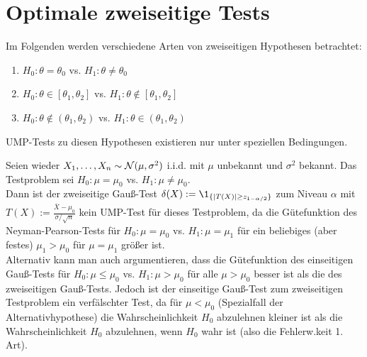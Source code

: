 \section{%
    Optimale zweiseitige Tests%
}

\begin{Bem}
    Im Folgenden werden verschiedene Arten von zweiseitigen Hypothesen betrachtet:
    \begin{enumerate}[label=\arabic*.]
        \item
        $H_0\colon \theta = \theta_0$ vs.
        $H_1\colon \theta \not= \theta_0$

        \item
        $H_0\colon \theta \in [\theta_1, \theta_2]$ vs.
        $H_1\colon \theta \notin [\theta_1, \theta_2]$

        \item
        $H_0\colon \theta \notin (\theta_1, \theta_2)$ vs.
        $H_1\colon \theta \in (\theta_1, \theta_2)$
    \end{enumerate}
    UMP-Tests zu diesen Hypothesen existieren nur unter speziellen Bedingungen.
\end{Bem}

\begin{Bsp}
    Seien wieder $X_1, \dotsc, X_n \sim \mathcal{N}(\mu, \sigma^2)$ i.i.d. mit $\mu$ unbekannt und
    $\sigma^2$ bekannt.
    Das Testproblem sei $H_0\colon \mu = \mu_0$ vs. $H_1\colon \mu \not= \mu_0$.\\
    Dann ist der zweiseitige Gauß-Test $\delta(X) := \1_{\{|T(X)| \ge z_{1-\alpha/2}\}}$
    zum Niveau $\alpha$ mit $T(X) := \frac{\overline{X} - \mu_0}{\sigma/\sqrt{n}}$
    kein UMP-Test für dieses Testproblem,
    da die Gütefunktion des Neyman-Pearson-Tests für
    $H_0\colon \mu = \mu_0$ vs. $H_1\colon \mu = \mu_1$ für ein beliebiges (aber festes)
    $\mu_1 > \mu_0$ für $\mu = \mu_1$ größer ist.\\
    Alternativ kann man auch argumentieren, dass die Gütefunktion des einseitigen Gauß-Tests für
    $H_0\colon \mu \le \mu_0$ vs. $H_1\colon \mu > \mu_0$ für alle $\mu > \mu_0$ besser ist
    als die des zweiseitigen Gauß-Tests.
    Jedoch ist der einseitige Gauß-Test zum zweiseitigen Testproblem ein verfälschter Test,
    da für $\mu < \mu_0$ (Spezialfall der Alternativhypothese) die Wahrscheinlichkeit
    $H_0$ abzulehnen kleiner ist als die Wahrscheinlichkeit $H_0$ abzulehnen, wenn $H_0$
    wahr ist (also die Fehlerw.keit 1. Art).
\end{Bsp}

